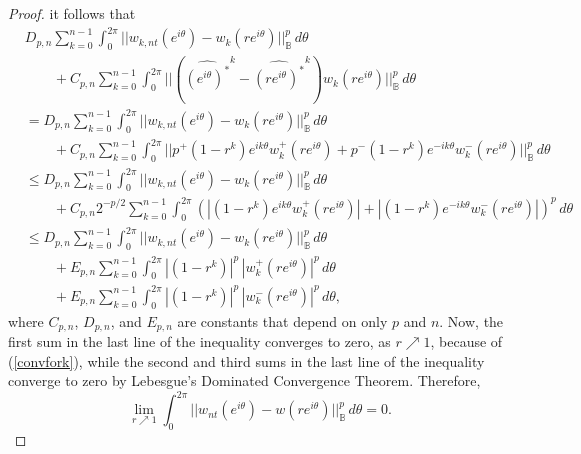 \documentclass[10pt,a4paper]{amsart}
\newcommand{\bc}{\mathbb{B}}
\begin{document}
\begin{proof}
       it follows that 
        \begin{align*}
&           D_{p,n} \sum_{k = 0}^{n-1} \int_0^{2\pi}                ||  w_{k,nt}(e^{i\theta}) -                                   w_k(re^{i\theta}) ||^p_{\bc} \, d\theta \\
            &\quad\quad + C_{p,n} \sum_{k = 0}^{n-1} \int_0^{2\pi}  ||  (\widehat{(e^{i\theta})^*}^k -  \widehat{(re^{i\theta})^*}^k )w_k(re^{i\theta}) ||^p_{\bc} \, d\theta\\
            &= D_{p,n} \sum_{k = 0}^{n-1} \int_0^{2\pi} ||  w_{k,nt}(e^{i\theta}) - w_k(re^{i\theta}) ||^p_{\bc} \, d\theta \\
            &\quad\quad + C_{p,n} \sum_{k = 0}^{n-1} \int_0^{2\pi}  || p^+ (1-r^k)e^{ik\theta}w_k^+(re^{i\theta}) + p^- (1-r^k)e^{-ik\theta} w_k^-(re^{i\theta}) ||^p_{\bc} \, d\theta\\
            &\leq D_{p,n} \sum_{k = 0}^{n-1} \int_0^{2\pi} ||  w_{k,nt}(e^{i\theta}) - w_k(re^{i\theta}) ||^p_{\bc} \, d\theta \\
            &\quad\quad + C_{p,n} 2^{-p/2}\sum_{k = 0}^{n-1} \int_0^{2\pi}  \left( |(1-r^k)e^{ik\theta}w_k^+(re^{i\theta})| + |(1-r^k)e^{-ik\theta} w_k^-(re^{i\theta}) | \right)^p \, d\theta\\
            &\leq D_{p,n} \sum_{k = 0}^{n-1} \int_0^{2\pi} ||  w_{k,nt}(e^{i\theta}) - w_k(re^{i\theta}) ||^p_{\bc} \, d\theta \\
            &\quad\quad + E_{p,n}\sum_{k = 0}^{n-1} \int_0^{2\pi}  |(1-r^k)|^p\, |w_k^+(re^{i\theta})|^p\,d\theta \\
            &\quad\quad + E_{p,n}\sum_{k = 0}^{n-1} \int_0^{2\pi} |(1-r^k)|^p \, | w_k^-(re^{i\theta}) |^p  \, d\theta ,
        \end{align*}
        where $C_{p,n}$, $D_{p,n}$, and $E_{p,n}$ are constants that depend on only $p$ and $n$. Now, the first sum in the last line of the inequality converges to zero, as $r \nearrow 1$, because of (\ref{convfork}), while the second and third sums in the last line of the inequality converge to zero by Lebesgue's Dominated Convergence Theorem. Therefore, 
        \[
            \lim_{r \nearrow 1} \int_0^{2\pi} ||w_{nt}(e^{i\theta}) - w(re^{i\theta}) ||^p_{\bc} \, d\theta  = 0. 
        \]

\end{proof}
\end{document}
